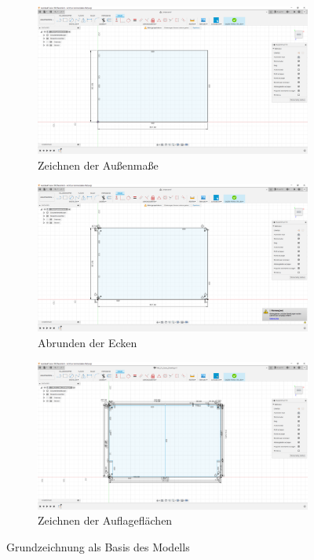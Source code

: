 \begin{figure}[H]
	\begin{subfigure}[b]{.5\linewidth}
		\includegraphics[width=1\textwidth]{img/konstruktion_gehaeuse_001.png}
		\caption[Zeichnen der Außenmaße]{Zeichnen der Außenmaße}
		\label{fig:design-case-01}
	\end{subfigure}
	\begin{subfigure}[b]{.5\linewidth}
		\includegraphics[width=1\textwidth]{img/konstruktion_gehaeuse_002.png}
		\caption[Abrunden der Ecken]{Abrunden der Ecken}
		\label{fig:design-case-02}
	\end{subfigure}
	\begin{subfigure}[b]{.5\linewidth}
		\includegraphics[width=1\textwidth]{img/konstruktion_gehaeuse_003.png}
		\caption[Zeichnen der Auflageflächen für das Gehäuse]{Zeichnen der Auflageflächen}
		\label{fig:design-case-03}
	\end{subfigure}
	\caption[Grundzeichnung als Basis des Modells]{Grundzeichnung als Basis des Modells}
	\label{fig:design-case-base}
\end{figure}\par
